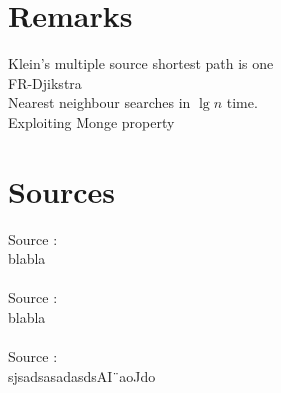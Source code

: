 \section{Remarks}
Klein's multiple source shortest path \cite{klein2005multiple} is one \\
FR-Djikstra \cite{fakcharoenphol2006planar}\\
Nearest neighbour searches in $\lg n$ time. \\
Exploiting Monge property

\section{Sources}
Source \cite{chechik2012improved}: \\
blabla \\
\\
Source \cite{hermelin2011distance}: \\
blabla \\
\\
Source \cite{thorup2004compact}: \\
sjsadsasadasdsAI¨aoJdo \\
